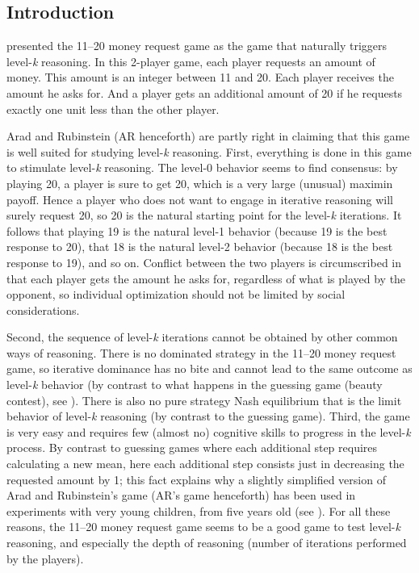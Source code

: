 \begin{Article}
\begin{refsection}[Umbhauer]



\section{Introduction}

\textcite{arad2012} presented the 11--20 money request game
as the game that naturally triggers level-\emph{k} reasoning. In this
2-player game, each player requests an amount of money. This amount is an integer between 11 and 20. Each player receives the amount he asks for. And a player gets an additional amount of 20 if he requests exactly one unit less than the other player.

Arad and Rubinstein (AR henceforth) are partly right in claiming that
this game is well suited for studying level-\emph{k} reasoning. First, everything is done in this game to stimulate level-\emph{k} reasoning. The level-0 behavior seems to find consensus: by playing 20, a player is sure to get 20, which is a very large (unusual) maximin payoff. Hence a player who does not want to engage in iterative reasoning will surely request 20, so 20 is the natural starting point for the level-\emph{k} iterations. It follows that playing 19 is the natural level-1 behavior (because 19 is the best response to 20), that 18 is the natural level-2 behavior (because 18 is the best response to 19), and so on. Conflict between the two players is circumscribed in that each player gets the amount he asks for, regardless of what is played by the opponent, so individual optimization should not be limited by social considerations.

Second, the sequence of level-\emph{k} iterations cannot be obtained by other common ways of reasoning. There is no dominated strategy in the 11--20 money request game, so iterative dominance has no bite and cannot lead to the same outcome as level-\emph{k} behavior (by contrast to what happens in the guessing game (beauty contest), see \textcite{nagel1995}). There is also no pure strategy Nash equilibrium that is the limit behavior of level-\emph{k} reasoning (by contrast to the guessing game). Third, the game is very easy and requires few (almost no) cognitive skills to progress in the level-\emph{k} process. By contrast to guessing games where each additional step requires calculating a new mean, here each additional step consists just in decreasing the requested amount by 1; this fact explains why a slightly simplified version of Arad and Rubinstein's game (AR's game henceforth) has been used in experiments with very young children, from five years old (see \textcite{fe2022}). For all these reasons, the 11--20 money request game seems to be a good game to test level-\emph{k} reasoning, and especially the depth of reasoning (number of iterations performed by the players).


\end{refsection}
\end{Article}
